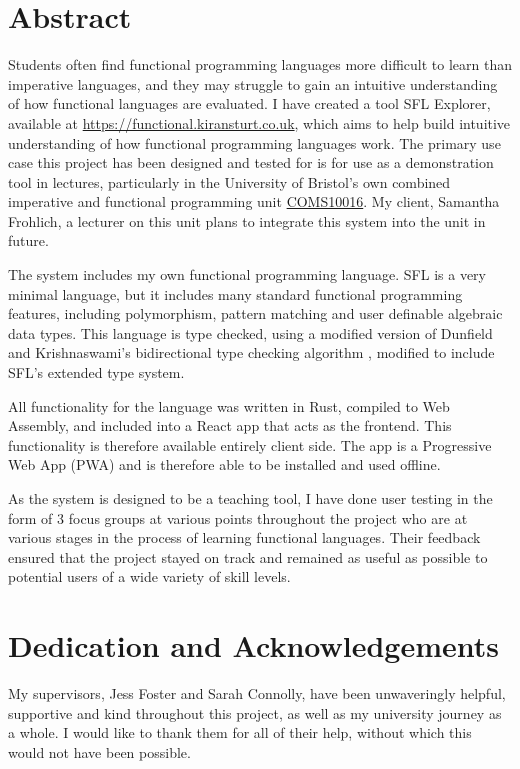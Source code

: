 \chapter*{Abstract}
Students often find functional programming languages more difficult to learn than imperative languages, and they may struggle to gain an intuitive understanding of how functional languages are evaluated. I have created a tool SFL Explorer, available at \href{https://functional.kiransturt.co.uk}{https://functional.kiransturt.co.uk}, which aims to help build intuitive understanding of how functional programming languages work. The primary use case this project has been designed and tested for is for use as a demonstration tool in lectures, particularly in the University of Bristol's own combined imperative and functional programming unit \hyperref[COMS10016]{COMS10016}. My client, Samantha Frohlich, a lecturer on this unit plans to integrate this system into the unit in future. 

The system includes my own functional programming language. SFL is a very minimal language, but it includes many standard functional programming features, including polymorphism, pattern matching and user definable algebraic data types. This language is type checked, using a modified version of Dunfield and Krishnaswami's bidirectional type checking algorithm \cite{completebidir}, modified to include SFL's extended type system. 

All functionality for the language was written in Rust, compiled to Web Assembly, and included into a React app that acts as the frontend. This functionality is therefore available entirely client side. The app is a Progressive Web App (PWA) and is therefore able to be installed and used offline. 

As the system is designed to be a teaching tool, I have done user testing in the form of 3 focus groups at various points throughout the project who are at various stages in the process of learning functional languages. Their feedback ensured that the project stayed on track and remained as useful as possible to potential users of a wide variety of skill levels. 


\chapter*{Dedication and Acknowledgements}
My supervisors, Jess Foster and Sarah Connolly, have been unwaveringly helpful, supportive and kind throughout this project, as well as my university journey as a whole. I would like to thank them for all of their help, without which this would not have been possible. 

